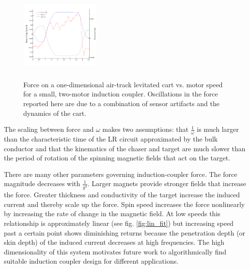 \begin{figure}
\includegraphics[width = 4cm, height = 4cm ]{figures/motor_force_speed_plot.png}
\label{fig:force_plot}
\caption{Force on a one-dimensional air-track levitated cart vs. motor speed for a small, two-motor induction coupler. Oscillations in the force reported here are due to a combination of sensor artifacts and the dynamics of the cart.}
\end{figure}

The scaling between force and $\omega$ makes two assumptions: that $\frac{1}{\omega}$ is much larger than the characteristic time of the LR circuit approximated by the bulk conductor and that the kinematics of the chaser and target are much slower than the period of rotation of the spinning magnetic fields that act on the target.

There are many other parameters governing induction-coupler force. The force magnitude decreases with $\frac{1}{g^4}$. Larger magnets provide stronger fields that increase the force. Greater thickness and 
conductivity of the target increase the induced current and thereby scale up the force. Spin speed increases the force nonlinearly by increasing the rate of change in the magnetic field. At low speeds this relationship is approximately linear (see fig. \ref{fig:lin_fit}) but increasing speed past a certain point shows diminishing returns because the penetration depth (or skin depth) of the induced current decreases at high frequencies. \cite{Paudel2013} The high dimensionality of this system motivates future work to algorithmically find suitable induction coupler design for different applications.